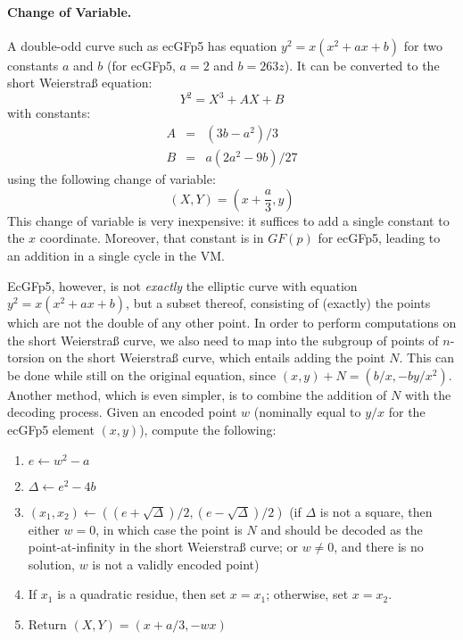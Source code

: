 \documentclass{llncs}
\newcommand{\GF}{GF}
\begin{document}
\paragraph{Change of Variable.} A double-odd curve such as ecGFp5 has
equation $y^2 = x(x^2 + ax + b)$ for two constants $a$ and $b$ (for
ecGFp5, $a = 2$ and $b = 263z$). It can be converted to the short
Weierstraß equation:
\begin{equation*}
    Y^2 = X^3 + A X + B
\end{equation*}
with constants:
\begin{eqnarray*}
    A &=& (3b - a^2)/3 \\
    B &=& a(2a^2 - 9b)/27
\end{eqnarray*}
using the following change of variable:
\begin{equation*}
    (X, Y) = (x + \frac{a}{3}, y)
\end{equation*}
This change of variable is very inexpensive: it suffices to add a single
constant to the $x$ coordinate. Moreover, that constant is in $\GF(p)$
for ecGFp5, leading to an addition in a single cycle in the VM.

EcGFp5, however, is not \emph{exactly} the elliptic curve with equation
$y^2 = x(x^2 + ax + b)$, but a subset thereof, consisting of (exactly)
the points which are not the double of any other point. In order to
perform computations on the short Weierstraß curve, we also need to map
into the subgroup of points of $n$-torsion on the short Weierstraß curve,
which entails adding the point $N$. This can be done while still on
the original equation, since $(x, y) + N = (b/x, -b y/x^2)$. Another
method, which is even simpler, is to combine the addition of $N$ with
the decoding process. Given an encoded point $w$ (nominally equal to $y/x$
for the ecGFp5 element $(x, y)$), compute the following:
\begin{enumerate}

    \item $e \leftarrow w^2 - a$

    \item $\Delta \leftarrow e^2 - 4b$

    \item $(x_1, x_2) \leftarrow ((e + \sqrt{\Delta})/2, (e - \sqrt{\Delta})/2)$
    (if $\Delta$ is not a square, then either $w = 0$, in which case the
    point is $N$ and should be decoded as the point-at-infinity in the
    short Weierstraß curve; or $w \neq 0$, and there is no solution, $w$
    is not a validly encoded point)

    \item \label{step:decode-choose-qr}If $x_1$ is a quadratic residue,
    then set $x = x_1$; otherwise, set $x = x_2$.

    \item Return $(X, Y) = (x + a/3, -wx)$

\end{enumerate}
\end{document}
